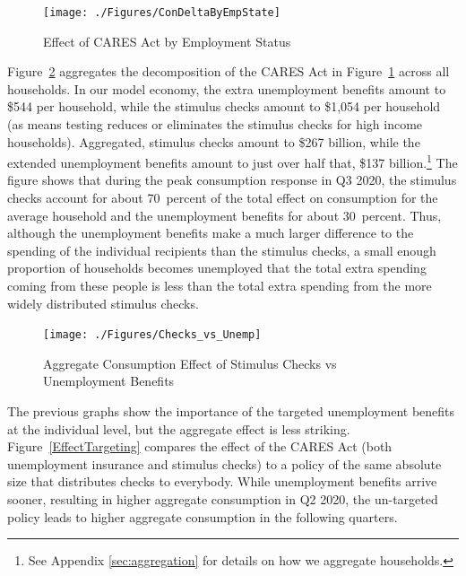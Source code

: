 \documentclass[titlepage,a4paper]{\econtex}
\begin{document}
\begin{figure}
  \centering
  \caption{Effect of CARES Act by Employment Status}
  \label{stim_by_emp}
  { \texttt{[image: ./Figures/ConDeltaByEmpState]}}
\end{figure}

Figure~\ref{checks_vs_unemp} aggregates the decomposition of the CARES Act in Figure~\ref{stim_by_emp} across all households.
In our model economy, the extra unemployment benefits amount to \$544 per household, while the stimulus checks amount to \$1,054 per household (as means testing reduces or eliminates the stimulus checks for high income households).
Aggregated, stimulus checks amount to \$267 billion, while the extended unemployment benefits amount to just over half that, \$137 billion.\footnote{See Appendix \ref{sec:aggregation} for details on how we aggregate households.}
The figure shows that during the peak consumption response in Q3 2020, the stimulus checks account for about 70~percent of the total effect on consumption for the average household and the unemployment benefits for about 30~percent.  Thus, although the unemployment benefits make a much larger difference to the spending of the individual recipients than the stimulus checks, a small enough proportion of households becomes unemployed that the total extra spending coming from these people is less than the total extra spending from the more widely distributed stimulus checks.

\begin{figure}
  \centering
  \caption{Aggregate Consumption Effect of Stimulus Checks vs Unemployment Benefits}
  \label{checks_vs_unemp}
  { \texttt{[image: ./Figures/Checks\_vs\_Unemp]}}
\end{figure}

The previous graphs show the importance of the targeted unemployment benefits at the individual level, but the aggregate effect is less striking.
Figure~\ref{EffectTargeting} compares the effect of the CARES Act (both unemployment insurance and stimulus checks) to a policy of the same absolute size that distributes checks to everybody.
While unemployment benefits arrive sooner, resulting in higher aggregate consumption in Q2 2020, the un-targeted policy leads to higher aggregate consumption in the following quarters.
\end{document}
